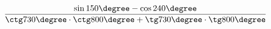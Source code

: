 \begin{ex}[type=calculate]
	\begin{condition}
		\( \dfrac{\sin150\degree-\cos240\degree}{\ctg730\degree\cdot\ctg800\degree+\tg730\degree\cdot\tg800\degree} \)
	\end{condition}
\end{ex}